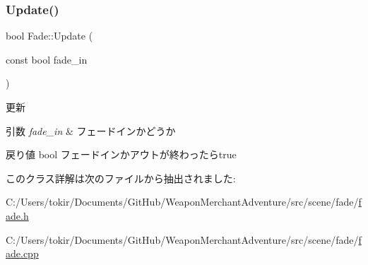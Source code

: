 \subsubsection{\texorpdfstring{Update()}{Update()}}
{\footnotesize\ttfamily bool Fade\+::\+Update (\begin{DoxyParamCaption}\item[{const bool}]{fade\+\_\+in }\end{DoxyParamCaption})}



更新 


\begin{DoxyParams}{引数}
{\em fade\+\_\+in} & フェードインかどうか \\
\hline
\end{DoxyParams}
\begin{DoxyReturn}{戻り値}
bool フェードインかアウトが終わったらtrue 
\end{DoxyReturn}


このクラス詳解は次のファイルから抽出されました\+:\begin{DoxyCompactItemize}
\item 
C\+:/\+Users/tokir/\+Documents/\+Git\+Hub/\+Weapon\+Merchant\+Adventure/src/scene/fade/\mbox{\hyperlink{fade_8h}{fade.\+h}}\item 
C\+:/\+Users/tokir/\+Documents/\+Git\+Hub/\+Weapon\+Merchant\+Adventure/src/scene/fade/\mbox{\hyperlink{fade_8cpp}{fade.\+cpp}}\end{DoxyCompactItemize}
